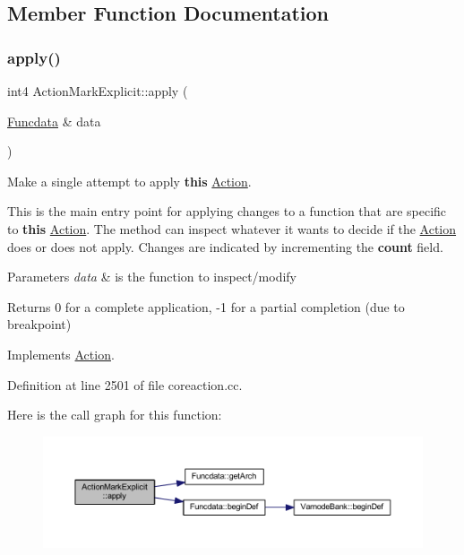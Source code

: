\subsection{Member Function Documentation}
\mbox{\label{class_action_mark_explicit_aea3570d9fb0a90407480fd25cb077f70}} 
\subsubsection{\texorpdfstring{apply()}{apply()}}
{\footnotesize\ttfamily int4 Action\+Mark\+Explicit\+::apply (\begin{DoxyParamCaption}\item[{\mbox{\hyperlink{class_funcdata}{Funcdata}} \&}]{data }\end{DoxyParamCaption})\hspace{0.3cm}{\ttfamily [virtual]}}



Make a single attempt to apply {\bfseries{this}} \mbox{\hyperlink{class_action}{Action}}. 

This is the main entry point for applying changes to a function that are specific to {\bfseries{this}} \mbox{\hyperlink{class_action}{Action}}. The method can inspect whatever it wants to decide if the \mbox{\hyperlink{class_action}{Action}} does or does not apply. Changes are indicated by incrementing the {\bfseries{count}} field. 
\begin{DoxyParams}{Parameters}
{\em data} & is the function to inspect/modify \\
\hline
\end{DoxyParams}
\begin{DoxyReturn}{Returns}
0 for a complete application, -\/1 for a partial completion (due to breakpoint) 
\end{DoxyReturn}


Implements \mbox{\hyperlink{class_action_aac1c3999d6c685b15f5d9765a4d04173}{Action}}.



Definition at line 2501 of file coreaction.\+cc.

Here is the call graph for this function\+:
\nopagebreak
\begin{figure}[H]
\begin{center}
\leavevmode
\includegraphics[width=350pt]{class_action_mark_explicit_aea3570d9fb0a90407480fd25cb077f70_cgraph}
\end{center}
\end{figure}
\mbox{\label{class_action_mark_explicit_a35862d8fd674fcf340ccf3bdd99a18e6}} 
